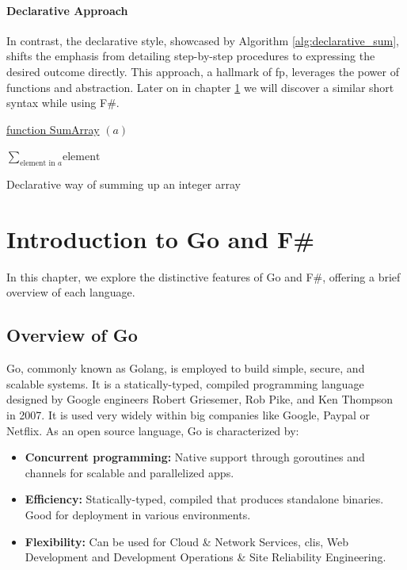 \subsubsection{Declarative Approach}

In contrast, the declarative style, showcased by Algorithm \ref{alg:declarative_sum}, shifts the emphasis from detailing step-by-step procedures to expressing the desired outcome directly. This approach, a hallmark of \ac{fp}, leverages the power of functions and abstraction. Later on in chapter \ref{chap:introgoandfsharp} we will discover a similar short syntax while using F\#.

\begin{algorithm}

    \underline{function SumArray} $(a)$\;
    
    \BlankLine
    \Return $\sum_{\text{element in } a} \text{element}$
    
    \caption{Declarative way of summing up an integer array}
    \label{alg:declarative_sum}
\end{algorithm}



\chapter{Introduction to Go and F\#}\label{chap:introgoandfsharp}
In this chapter, we explore the distinctive features of Go and F\#, offering a brief overview of each language.

    \section{Overview of Go}\label{sec:go-overview}
    Go, commonly known as Golang, is employed to build simple, secure, and scalable systems. It is a statically-typed, compiled programming language designed by Google engineers Robert Griesemer, Rob Pike, and Ken Thompson in 2007. It is used very widely within big companies like Google, Paypal or Netflix. As an open source language, Go is characterized by: 
    \begin{itemize}
        \item \textbf{Concurrent programming:}  Native support through goroutines and channels for scalable and parallelized \ac{app}s.
        \item \textbf{Efficiency:} Statically-typed, compiled that produces standalone binaries. Good for deployment in various environments.
        \item \textbf{Flexibility:} Can be used for Cloud \& Network Services, \ac{cli}s, Web Development and Development Operations \& Site Reliability Engineering.
    \end{itemize}
    \cite{Gowebsite}

